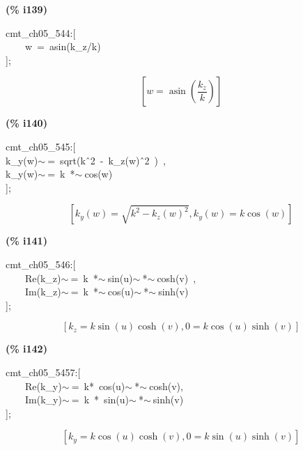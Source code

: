\documentclass[fleqn]{article}
\begin{document}
\noindent
\begin{minipage}[t]{4.000000em}\color{red}\bfseries
(\% i139)	
\end{minipage}
\begin{minipage}[t]{\textwidth}\color{blue}
cmt\_ch05\_544:[\\
\ \ \ \ w\ =\ asin(k\_z/k)\\
];
\end{minipage}
\[\displaystyle \tag{\% o139} 
\left[ w=\operatorname{asin}\left( \frac{{k_z}}{k}\right) \right] \mbox{}
\]


\noindent
\begin{minipage}[t]{4.000000em}\color{red}\bfseries
(\% i140)	
\end{minipage}
\begin{minipage}[t]{\textwidth}\color{blue}
cmt\_ch05\_545:[\\
k\_y(w)\ensuremath{\sim\ }=\ sqrt(k\^\ 2\ -\ k\_z(w)\^\ 2\ )\ ,\\
k\_y(w)\ensuremath{\sim\ }=\ k\ *\ensuremath{\sim\ }cos(w)\\
];
\end{minipage}
\[\displaystyle \tag{\% o140} 
\left[ {k_y}(w)=\sqrt{{{k}^{2}}-{{{k_z}(w)}^{2}}}\operatorname{,}{k_y}(w)=k \cos{(w)}\right] \mbox{}
\]


\noindent
\begin{minipage}[t]{4.000000em}\color{red}\bfseries
(\% i141)	
\end{minipage}
\begin{minipage}[t]{\textwidth}\color{blue}
cmt\_ch05\_546:[\\
\ \ \ \ Re(k\_z)\ensuremath{\sim\ }=\ k\ *\ensuremath{\sim\ }sin(u)\ensuremath{\sim\ }*\ensuremath{\sim\ }cosh(v)\ ,\ \\
\ \ \ \ Im(k\_z)\ensuremath{\sim\ }=\ k\ *\ensuremath{\sim\ }cos(u)\ensuremath{\sim\ }*\ensuremath{\sim\ }sinh(v)\\
];
\end{minipage}
\[\displaystyle \tag{\% o141} 
\left[ {k_z}=k \sin{(u)} \cosh{(v)}\operatorname{,}0=k \cos{(u)} \sinh{(v)}\right] \mbox{}
\]


\noindent
\begin{minipage}[t]{4.000000em}\color{red}\bfseries
(\% i142)	
\end{minipage}
\begin{minipage}[t]{\textwidth}\color{blue}
cmt\_ch05\_5457:[\\
\ \ \ \ Re(k\_y)\ensuremath{\sim\ }=\ k*\ cos(u)\ensuremath{\sim\ }*\ensuremath{\sim\ }cosh(v),\\
\ \ \ \ Im(k\_y)\ensuremath{\sim\ }=\ k\ *\ sin(u)\ensuremath{\sim\ }*\ensuremath{\sim\ }sinh(v)\\
];
\end{minipage}
\[\displaystyle \tag{\% o142} 
\left[ {k_y}=k \cos{(u)} \cosh{(v)}\operatorname{,}0=k \sin{(u)} \sinh{(v)}\right] \mbox{}
\]
\end{document}

